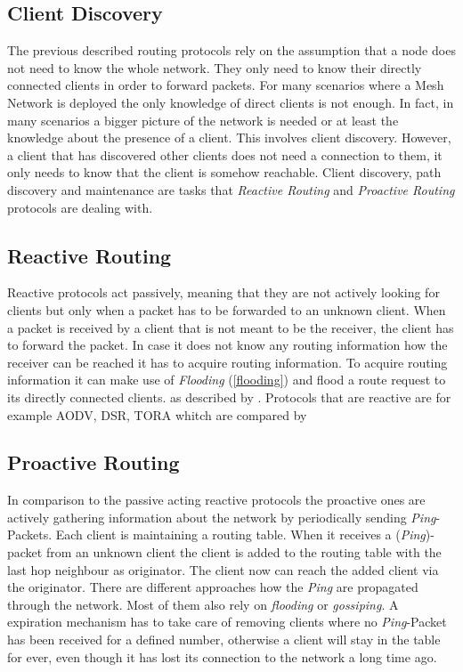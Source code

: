 \subsection{Client Discovery}
The previous described routing protocols rely on the assumption that a node does not need to know the whole network. They only need to know their directly connected clients in order to forward packets.
For many scenarios where a Mesh Network is deployed the only knowledge of direct clients is not enough. In fact, in many scenarios a bigger picture of the network is needed or at least the knowledge about the presence of a client. This involves client discovery. However, a client that has discovered other clients does not need a connection to them, it only needs to know that the client is somehow reachable.
Client discovery, path discovery and maintenance are tasks that \textit{Reactive Routing} and \textit{Proactive Routing} protocols are dealing with.

\subsection{Reactive Routing}
Reactive protocols act passively, meaning that they are not actively looking for clients but only when a packet has to be forwarded to an unknown client.
When a packet is received by a client that is not meant to be the receiver, the client has to forward the packet. In case it does not know any routing information how the receiver can be reached it has to acquire routing information. 
To acquire routing information it can make use of \textit{Flooding} (\cref{flooding}) and flood a route request to its directly connected clients.  as described by \citet[\S1.3]{Mukhija_Arun}. 
Protocols that are reactive are for example AODV, DSR, TORA whitch are compared by \citet{kalwar_2010}

\subsection{Proactive Routing}
In comparison to the passive acting reactive protocols the proactive ones are actively gathering information about the network by periodically sending \textit{Ping}-Packets. Each client is maintaining a routing table. When it receives a (\textit{Ping})-packet from an unknown client the client is added to the routing table with the last hop neighbour as originator. The client now can reach the added client via the originator. 
There are different approaches how the \textit{Ping} are propagated through the network. Most of them also rely on \textit{flooding} or \textit{gossiping}.
A expiration mechanism has to take care of removing clients where no \textit{Ping}-Packet has been received for a defined number, otherwise a client will stay in the table for ever, even though it has lost its connection to the network a long time ago.

